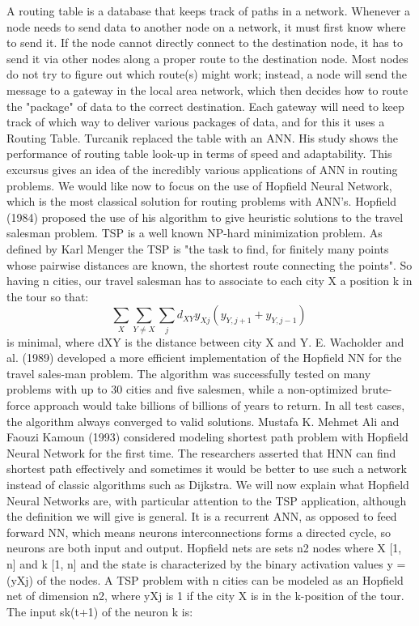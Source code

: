 A routing table is a database that keeps track of paths in a network. Whenever a node needs to send data to another node on a network, it must first know where to send it. If the node cannot directly connect to the destination node, it has to send it via other nodes along a proper route to the destination node. Most nodes do not try to figure out which route(s) might work; instead, a node will send the message to a gateway in the local area network, which then decides how to route the "package" of data to the correct destination. Each gateway will need to keep track of which way to deliver various packages of data, and for this it uses a Routing Table. 
Turcanik replaced the table with an ANN. His study shows the performance of routing table look-up in terms of speed and adaptability.
\bigbreak
This excursus gives an idea of the incredibly various applications of ANN in routing problems.
We would like now to focus on the use of Hopfield Neural Network, which is the most classical solution for routing problems with ANN's.
\bigbreak
Hopfield (1984) proposed the use of his algorithm to give heuristic solutions to the travel salesman problem.
TSP is a well known NP-hard minimization problem. As defined by Karl Menger the TSP is "the task to find, for finitely many points whose pairwise distances are known, the shortest route connecting the points". So having n cities, our travel salesman has to associate to each city X a position k in the tour so that: 
\begin{equation*}
\sum_{X}\sum_{Y\neq X}\sum_{j}{d_{XY}y_{Xj}(y_{Y,j+1}+y_{Y,j-1})\ }
\end{equation*}
is minimal, where dXY is the distance between city X and Y.
\bigbreak
E. Wacholder and al. (1989) developed a more efficient implementation of the Hopfield NN for the travel sales-man problem. The algorithm was successfully tested on many problems with up to 30 cities and five salesmen, while a non-optimized brute-force approach would take billions of billions of years to return. In all test cases, the algorithm always converged to valid solutions.
\bigbreak
Mustafa K. Mehmet Ali and Faouzi Kamoun (1993) considered modeling shortest path problem with Hopfield Neural Network for the first time. The researchers asserted that HNN can find shortest path effectively and sometimes it would be better to use such a network instead of classic algorithms such as Dijkstra.
\bigbreak
We will now explain what Hopfield Neural Networks are, with particular attention to the TSP application, although the definition we will give is general.
It is a recurrent ANN, as opposed to feed forward NN, which means neurons interconnections forms a directed cycle, so neurons are both input and output. 
Hopfield nets are sets n2 nodes where X [1, n] and k  [1, n] and the state is characterized by the binary activation values y = (yXj) of the nodes.
A TSP problem with n cities can be modeled as an Hopfield net of dimension n2, where yXj is 1 if the city X is in the k-position of the tour.
\bigbreak
The input sk(t+1) of the neuron k is:



